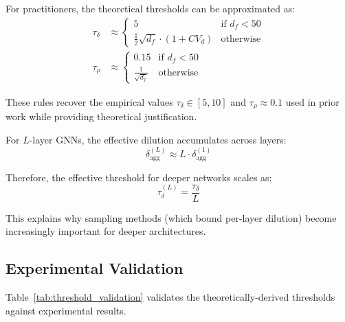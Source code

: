 \begin{corollary}
\label{cor:simplified_thresholds}
For practitioners, the theoretical thresholds can be approximated as:
\begin{align}
\tau_\delta &\approx \begin{cases}
5 & \text{if } d_f < 50 \\
\frac{1}{2}\sqrt{d_f} \cdot (1 + CV_d) & \text{otherwise}
\end{cases} \\
\tau_\rho &\approx \begin{cases}
0.15 & \text{if } d_f < 50 \\
\frac{1}{\sqrt{d_f}} & \text{otherwise}
\end{cases}
\end{align}

These rules recover the empirical values $\tau_\delta \in [5,10]$ and $\tau_\rho \approx 0.1$ used in prior work while providing theoretical justification.
\end{corollary}

\begin{corollary}
\label{cor:multilayer}
For $L$-layer GNNs, the effective dilution accumulates across layers:
\begin{equation}
\delta_{\text{agg}}^{(L)} \approx L \cdot \delta_{\text{agg}}^{(1)}
\end{equation}

Therefore, the effective threshold for deeper networks scales as:
\begin{equation}
\tau_\delta^{(L)} = \frac{\tau_\delta}{L}
\end{equation}

This explains why sampling methods (which bound per-layer dilution) become increasingly important for deeper architectures.
\end{corollary}

\subsection{Experimental Validation}

Table~\ref{tab:threshold_validation} validates the theoretically-derived thresholds against experimental results.

